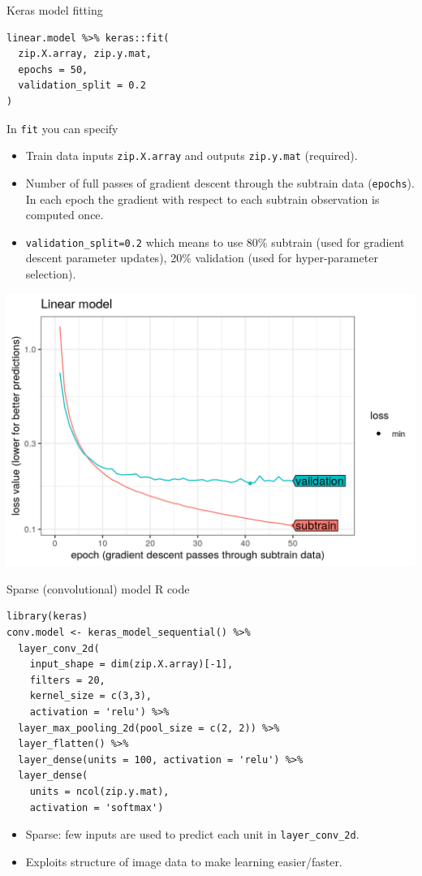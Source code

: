 \documentclass{article}
\begin{document}
{Keras model fitting}
\begin{verbatim}
linear.model %>% keras::fit(
  zip.X.array, zip.y.mat,
  epochs = 50,
  validation_split = 0.2
)
\end{verbatim}
In \texttt{fit} you can specify
\begin{itemize}
\item Train data inputs \texttt{zip.X.array} and outputs
  \texttt{zip.y.mat} (required).
\item Number of full passes of gradient descent through the subtrain
  data (\texttt{epochs}). In each epoch the gradient with respect to
  each subtrain observation is computed once.
\item \texttt{validation\_split=0.2} which means to use 80\% subtrain
  (used for gradient descent parameter updates), 20\% validation (used
  for hyper-parameter selection). 
\end{itemize}

\includegraphics[width=\textwidth]{figure-validation-loss-linear}

{Sparse (convolutional) model R code}
\begin{verbatim}
library(keras)
conv.model <- keras_model_sequential() %>%
  layer_conv_2d(
    input_shape = dim(zip.X.array)[-1],
    filters = 20,
    kernel_size = c(3,3),
    activation = 'relu') %>% 
  layer_max_pooling_2d(pool_size = c(2, 2)) %>%
  layer_flatten() %>%
  layer_dense(units = 100, activation = 'relu') %>% 
  layer_dense(
    units = ncol(zip.y.mat), 
    activation = 'softmax')
\end{verbatim}
  \begin{itemize}
  \item Sparse: few inputs are used to predict each unit in
    \texttt{layer\_conv\_2d}.
  \item Exploits structure of image data to make learning
    easier/faster.
  \end{itemize}
\end{document}
